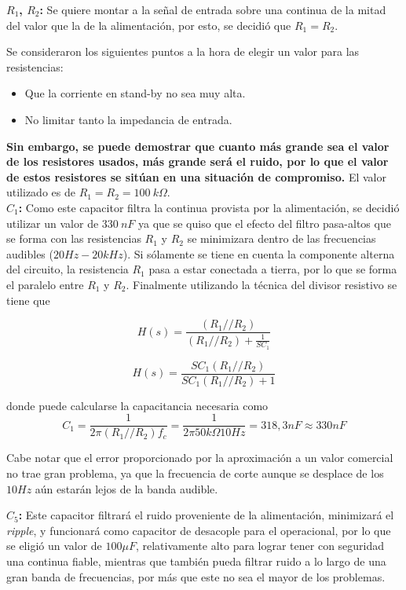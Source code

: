 \textbf{$R_1$, $R_2$:} Se quiere montar a la señal de entrada sobre una continua de la mitad del valor que la de la alimentación, por esto, se decidió que $R_1=R_2$.

Se consideraron los siguientes puntos a la hora de elegir un valor para las resistencias:
\begin{itemize}
\item Que la corriente en stand-by no sea muy alta.
\item No limitar tanto la impedancia de entrada.
\end{itemize}
\textbf{Sin embargo, se puede demostrar que cuanto más grande sea el valor de los resistores usados, más grande será el ruido, por lo que el valor de estos resistores se sitúan en una situación de compromiso.}
El valor utilizado es de $R_1=R_2=100 \ k\Omega$.\\

\textbf{$C_1$:} Como este capacitor filtra la continua provista por la alimentación, se decidió utilizar un valor de $330 \ nF$ ya que se quiso que el efecto del filtro pasa-altos que se forma con las resistencias $R_1$ y $R_2$ se minimizara dentro de las frecuencias audibles ($20Hz-20kHz$).
Si sólamente se tiene en cuenta la componente alterna del circuito, la resistencia $R_1$ pasa a estar conectada a tierra, por lo que se forma el paralelo entre $R_1$ y $R_2$. Finalmente utilizando la técnica del divisor resistivo se tiene que

\begin{equation}
H(s) = \frac{(R_1//R_2)}{(R_1//R_2) + \frac{1}{SC_1}}
\end{equation}

\begin{equation}
H(s) = \frac{SC_1(R_1//R_2)}{SC_1(R_1//R_2) + 1}
\end{equation}

donde puede calcularse la capacitancia necesaria como
\begin{equation}
C_1=\frac{1}{2\pi (R_1//R_2) f_c} = \frac{1}{2\pi 50k\Omega 10Hz} = 318,3nF \approx 330nF
\end{equation}

Cabe notar que el error proporcionado por la aproximación a un valor comercial no trae gran problema, ya que la frecuencia de corte aunque se desplace de los $10Hz$ aún estarán lejos de la banda audible.

\textbf{$C_5$:} Este capacitor filtrará el ruido proveniente de la alimentación, minimizará el \textit{ripple}, y funcionará como capacitor de desacople para el operacional, por lo que se eligió un valor de $100\mu F$, relativamente alto para lograr tener con seguridad una continua fiable, mientras que también pueda filtrar ruido a lo largo de una gran banda de frecuencias, por más que este no sea el mayor de los problemas.

